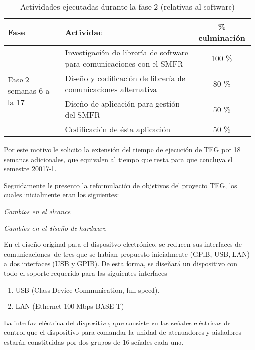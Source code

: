 \documentclass[paper=letter,oneside,fontsize=12pt, parskip=full]{article}
\begin{document}
	\begin{table}[h!]
		\begin{tabularx}{\textwidth}{p{}p{}c}
			\toprule
			{\large Fase} & 
			{\large Actividad} & 
			{\large \% culminación} \\
			\midrule
			\multirow{4}{0.2\textwidth}{Fase 2 \newline semanas 6 a la 17} &
			Investigación de librería de software para comunicaciones con el SMFR & 100 \% \\
			& Diseño y codificación de librería de comunicaciones alternativa & 80 \% \\
			& Diseño de aplicación para gestión del SMFR & 50 \% \\
			& Codificación de ésta aplicación & 50 \% \\	
			\bottomrule	
		\end{tabularx}
		\caption{Actividades ejecutadas durante la fase 2 (relativas al software)}
	\end{table}
	
	
		
	Por este motivo le solicito la extensión del tiempo de ejecución de TEG por 18 semanas adicionales, que equivalen al tiempo que resta para que concluya el semestre 20017-1.
	
	Seguidamente le presento la reformulación de objetivos del proyecto TEG, los cuales inicialmente eran los siguientes:		

	


	\emph{Cambios en el alcance}
	
	\emph{Cambios en el diseño de hardware}

	En el diseño original para el dispositvo electrónico, se reducen sus  interfaces de comunicaciones, de tres que se habían propuesto inicialmente (GPIB, USB, LAN) a dos interfaces (USB y GPIB). De esta forma, se diseñará un dispositivo con todo el soporte requerido para las siguientes interfaces
	
	\begin{enumerate}
		\item USB (Class Device Communication, full speed).		
		\item LAN (Ethernet 100 Mbps BASE-T)
	\end{enumerate}

	La interfaz eléctrica del dispositivo,  que consiste en las señales eléctricas de control que el dispositivo para comandar la unidad de atenuadores y aisladores estarán constituidas por dos grupos de 16 señales cada uno. 
	
\end{document}
